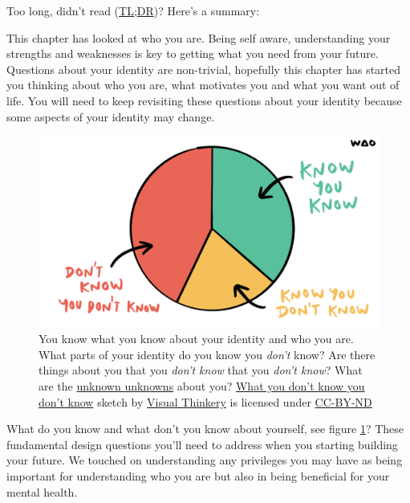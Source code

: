 \documentclass[
]{book}
\begin{document}
Too long, didn't read (\href{https://en.wiktionary.org/wiki/too_long;_didn\%27t_read}{TL;DR})? Here's a summary:

This chapter has looked at who you are. Being self aware, understanding your strengths and weaknesses is key to getting what you need from your future. Questions about your identity are non-trivial, hopefully this chapter has started you thinking about who you are, what motivates you and what you want out of life. You will need to keep revisiting these questions about your identity because some aspects of your identity may change.

\begin{figure}

{\centering \includegraphics[width=1\linewidth]{images/you-dont-know-you-dont-know} 

}

\caption{You know what you know about your identity and who you are. What parts of your identity do you know you \emph{don't} know? Are there things about you that you \emph{don't know} that you \emph{don't know}? What are the \href{https://en.wikipedia.org/wiki/There_are_known_knowns}{unknown unknowns} about you? \href{https://bryanmmathers.com/what-you-dont-know-you-dont-know}{What you don't know you don't know} sketch by \href{https://visualthinkery.com/}{Visual Thinkery} is licensed under \href{https://creativecommons.org/licenses/by-nd/4.0/}{CC-BY-ND}}\label{fig:mathers-known-fig}
\end{figure}



What do you know and what don't you know about yourself, see figure \ref{fig:mathers-known-fig}? These fundamental design questions you'll need to address when you starting building your future. We touched on understanding any privileges you may have as being important for understanding who you are but also in being beneficial for your mental health.
\end{document}
